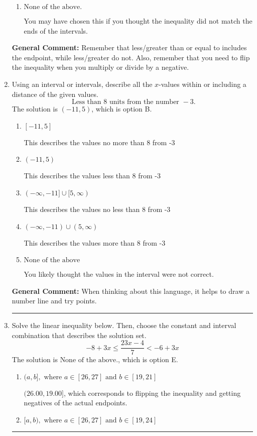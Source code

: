 \documentclass{extbook}[14pt]
\newcommand{\litem}[1]{\item #1

\rule{\textwidth}{0.4pt}}
\begin{document}
\begin{enumerate}
{\begin{enumerate}[label=\Alph*.]
 $[0.85, \infty)$, which corresponds to negating the endpoint of the solution.
\item \( \text{None of the above}. \)

You may have chosen this if you thought the inequality did not match the ends of the intervals.
\end{enumerate}

\textbf{General Comment:} Remember that less/greater than or equal to includes the endpoint, while less/greater do not. Also, remember that you need to flip the inequality when you multiply or divide by a negative.
}
\litem{
Using an interval or intervals, describe all the $x$-values within or including a distance of the given values.
\[ \text{ Less than } 8 \text{ units from the number } -3. \]The solution is \( (-11, 5) \), which is option B.\begin{enumerate}[label=\Alph*.]
\item \( [-11, 5] \)

This describes the values no more than 8 from -3
\item \( (-11, 5) \)

This describes the values less than 8 from -3
\item \( (-\infty, -11] \cup [5, \infty) \)

This describes the values no less than 8 from -3
\item \( (-\infty, -11) \cup (5, \infty) \)

This describes the values more than 8 from -3
\item \( \text{None of the above} \)

You likely thought the values in the interval were not correct.
\end{enumerate}

\textbf{General Comment:} When thinking about this language, it helps to draw a number line and try points.
}
\litem{
Solve the linear inequality below. Then, choose the constant and interval combination that describes the solution set.
\[ -8 + 3 x \leq \frac{23 x - 4}{7} < -6 + 3 x \]The solution is \( \text{None of the above.} \), which is option E.\begin{enumerate}[label=\Alph*.]
\item \( (a, b], \text{ where } a \in [26, 27] \text{ and } b \in [19, 21] \)

$(26.00, 19.00]$, which corresponds to flipping the inequality and getting negatives of the actual endpoints.
\item \( [a, b), \text{ where } a \in [26, 27] \text{ and } b \in [19, 24] \)


\end{enumerate}}
\end{enumerate}
\end{document}
